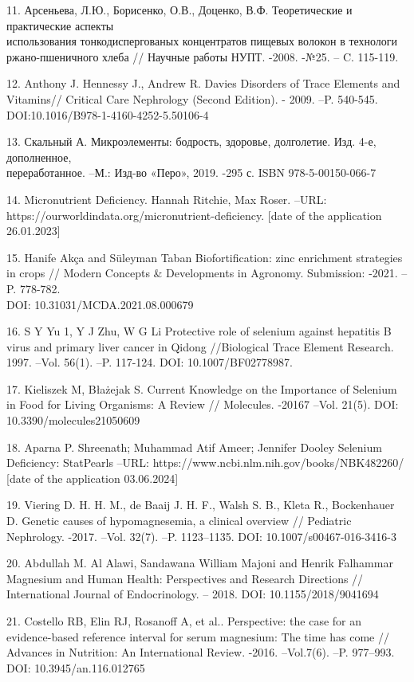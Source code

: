\begin{noparindent}
11. Арсеньева, Л.Ю., Борисенко, О.В., Доценко, В.Ф. Теоретические и
практические аспекты \\использования тонкодиспергованых концентратов
пищевых волокон в технологи ржано-пшеничного хлеба // Научные работы
НУПТ. -2008. -№25. -- C. 115-119.

12. Anthony J. Hennessy J., Andrew R. Davies Disorders of Trace Elements
and Vitamins// Critical Care Nephrology (Second Edition). - 2009. --P.
540-545. DOI:10.1016/B978-1-4160-4252-5.50106-4

13. Скальный А. Микроэлементы: бодрость, здоровье, долголетие. Изд. 4-е,
дополненное, \\переработанное. --М.: Изд-во «Перо», 2019. -295 с. ISBN
978-5-00150-066-7

14. Micronutrient Deficiency. Hannah Ritchie, Max Roser. --URL:
https://ourworldindata.org/micronutrient-deficiency. {[}date of the
application 26.01.2023{]}

15. Hanife Akça and Süleyman Taban Biofortification: zinc enrichment
strategies in crops // Modern Concepts \& Developments in Agronomy.
Submission: -2021. --P. 778-782. \\DOI: 10.31031/MCDA.2021.08.000679

16. S Y Yu 1, Y J Zhu, W G Li Protective role of selenium against
hepatitis B virus and primary liver cancer in Qidong //Biological Trace
Element Research. 1997. --Vol. 56(1). --P. 117-124. DOI:
10.1007/BF02778987.

17. Kieliszek M, Błażejak S. Current Knowledge on the Importance of
Selenium in Food for Living Organisms: A Review // Molecules. -20167
--Vol. 21(5). DOI: 10.3390/molecules21050609

18. Aparna P. Shreenath; Muhammad Atif Ameer; Jennifer Dooley Selenium
Deficiency: StatPearls --URL:
https://www.ncbi.nlm.nih.gov/books/NBK482260/ {[}date of the application
03.06.2024{]}

19. Viering D. H. H. M., de Baaij J. H. F., Walsh S. B., Kleta R.,
Bockenhauer D. Genetic causes of hypomagnesemia, a clinical overview //
Pediatric Nephrology. -2017. --Vol. 32(7). --P. 1123--1135. DOI:
10.1007/s00467-016-3416-3

20. Abdullah M. Al Alawi, Sandawana William Majoni and Henrik Falhammar
Magnesium and Human Health: Perspectives and Research Directions //
International Journal of Endocrinology. -- 2018. DOI:
10.1155/2018/9041694

21. Costello RB, Elin RJ, Rosanoff A, et al.. Perspective: the case for
an evidence-based reference interval for serum magnesium: The time has
come // Advances in Nutrition: An International Review. -2016.
--Vol.7(6). --P. 977--993. DOI: 10.3945/an.116.012765


\end{noparindent}
